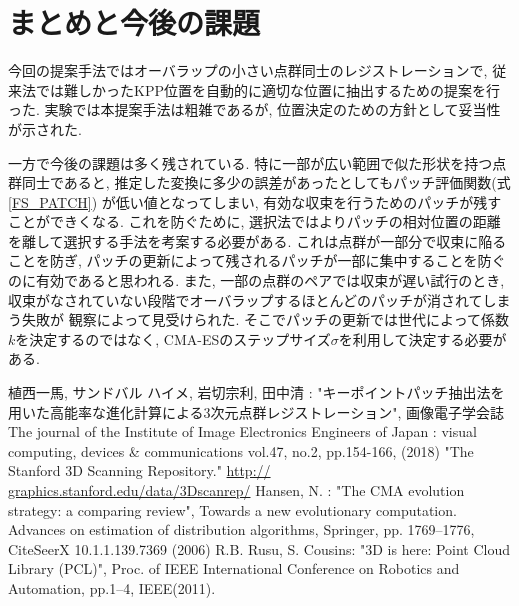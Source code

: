 \documentclass[twocolumn, 9pt, a4j, dvipdfmx]{jsarticle}
\begin{document}
\section{まとめと今後の課題}
今回の提案手法ではオーバラップの小さい点群同士のレジストレーションで, 
従来法では難しかったKPP位置を自動的に適切な位置に抽出するための提案を行った.
実験では本提案手法は粗雑であるが, 位置決定のための方針として妥当性が示された. 

一方で今後の課題は多く残されている. 
特に一部が広い範囲で似た形状を持つ点群同士であると, 
推定した変換に多少の誤差があったとしてもパッチ評価関数(式\ref{FS_PATCH})
が低い値となってしまい, 
有効な収束を行うためのパッチが残すことができくなる. 
これを防ぐために, 
選択法ではよりパッチの相対位置の距離を離して選択する手法を考案する必要がある. 
これは点群が一部分で収束に陥ることを防ぎ, 
パッチの更新によって残されるパッチが一部に集中することを防ぐのに有効であると思われる. 
また, 一部の点群のペアでは収束が遅い試行のとき, 
収束がなされていない段階でオーバラップするほとんどのパッチが消されてしまう失敗が
観察によって見受けられた. 
そこでパッチの更新では世代によって係数$k$を決定するのではなく, 
CMA-ESのステップサイズ$\sigma$を利用して決定する必要がある. 


\normalsize
\begin{thebibliography}{1}
 植西一馬, サンドバル ハイメ, 岩切宗利, 田中清 : 
"キーポイントパッチ抽出法を用いた高能率な進化計算による3次元点群レジストレーション", 
画像電子学会誌 The journal of the Institute of Image Electronics Engineers of Japan : 
visual computing, devices \& communications vol.47, no.2, pp.154-166, (2018)
 "The Stanford 3D Scanning Repository." \url{http://
graphics.stanford.edu/data/3Dscanrep/} 
 Hansen, N. : 
"The CMA evolution strategy: a comparing review", Towards a new evolutionary 
computation. Advances on estimation of distribution algorithms, 
Springer, pp. 1769–1776, CiteSeerX 10.1.1.139.7369 (2006)
R.B. Rusu, S. Cousins: "3D is here: Point Cloud Library (PCL)", 
Proc. of IEEE International Conference on Robotics and Automation, pp.1–4, 
IEEE(2011).
\end{thebibliography}
\normalsize
\end{document}
